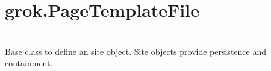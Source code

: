 \section{grok.PageTemplateFile}

\section{}

  Base class to define an site object. Site objects provide persistence and
  containment.

\section{}

\section{}

\section{}
